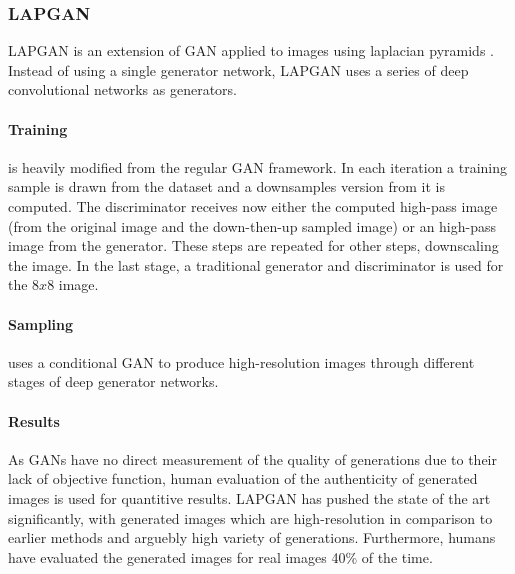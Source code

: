 \subsubsection{LAPGAN \cite{lapgan:2015}}
\label{ssub:lapgan}
LAPGAN is an extension of GAN applied to images using laplacian pyramids \cite{laplacian:1983}.
Instead of using a single generator network, LAPGAN uses a series of deep convolutional networks as generators.

\paragraph{Training} is heavily modified from the regular GAN framework.
In each iteration a training sample is drawn from the dataset and a downsamples version from it is computed.
The discriminator receives now either the computed high-pass image (from the original image and the down-then-up sampled image) or an high-pass image from the generator.
These steps are repeated for other steps, downscaling the image.
In the last stage, a traditional generator and discriminator is used for the $8x8$ image.
\paragraph{Sampling} uses a conditional GAN to produce high-resolution images through different stages of deep generator networks.

\paragraph{Results}
As GANs have no direct measurement of the quality of generations due to their lack of objective function, human evaluation of the authenticity of generated images is used for quantitive results.
LAPGAN has pushed the state of the art significantly, with generated images which are high-resolution in comparison to earlier methods and arguebly high variety of generations.
Furthermore, humans have evaluated the generated images for real images 40\% of the time.


